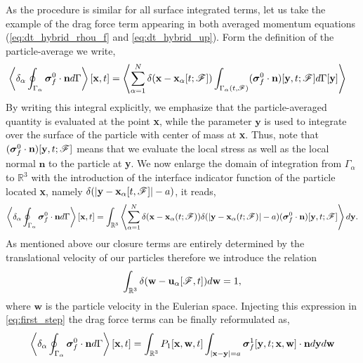 As the procedure is similar for all surface integrated terms, let us take the example of the drag force term appearing in both averaged momentum equations (\ref{eq:dt_hybrid_rhou_f} and \ref{eq:dt_hybrid_up}). 
Form the definition of the particle-average we write,
\begin{align}
    \left<\delta_\alpha \oint_{\Gamma_{\alpha}} \bm\sigma_f^0\cdot\textbf{n} d\Gamma\right>[\textbf{x},t]
    &= \left< \sum_{\alpha=1}^N \delta(\textbf{x}-\textbf{x}_\alpha[t; \mathscr{F}])
    \int_{\Gamma_\alpha(t,\mathscr{F})}
    (\bm\sigma_f^0\cdot\textbf{n})[\textbf{y},t;\mathscr{F}]
    d\Gamma[\textbf{y}] \right>
\end{align}
By writing this integral explicitly, we emphasize that the particle-averaged quantity is evaluated at the point \textbf{x}, while the parameter $\textbf{y}$ is used to integrate over the surface of the particle with center of mass at \textbf{x}. 
Thus, note that $(\bm\sigma_f^0\cdot\textbf{n})[\textbf{y},t;\mathscr{F}]$ means that we evaluate the local stress as well as the local normal $\textbf{n}$ to the particle at \textbf{y}. 
We now enlarge the domain of integration from $\Gamma_\alpha$ to $\mathbb{R}^3$ with the introduction of the interface indicator function of the particle located \textbf{x}, namely $\delta(|\textbf{y} - \textbf{x}_\alpha[t,\mathscr{F}]| - a)$, 
it reads,
\begin{equation}
    \left<\delta_\alpha \oint_{\Gamma_{\alpha}} \bm\sigma_f^0\cdot\textbf{n} d\Gamma\right>[\textbf{x},t]
    = 
    \int_{\mathbb{R}^3}
    \left<
     \sum_{\alpha=1}^N 
     \delta(\textbf{x}-\textbf{x}_\alpha(t; \mathscr{F}))
    \delta(|\textbf{y} - \textbf{x}_{\alpha}(t;\mathscr{F})|-a)
    (\bm\sigma_f^0\cdot\textbf{n})[\textbf{y},t;\mathscr{F}]
    \right>
    d\textbf{y}. 
\end{equation} 
As mentioned above our closure terms are entirely determined by the translational velocity of our particles therefore we introduce the relation 
\begin{equation*}
    \int_{\mathbb{R}^3} \delta(\textbf{w} - \textbf{u}_\alpha[\mathscr{F},t]) d\textbf{w} = 1,
\end{equation*}
where $\textbf{w}$ is the particle velocity in the Eulerian space. 
Injecting this expression in \ref{eq:first_step} the drag force terms can be finally reformulated as, 
\begin{equation}
    \left<\delta_\alpha \oint_{\Gamma_{\alpha}} \bm\sigma_f^0\cdot\textbf{n} d\Gamma\right>[\textbf{x},t]
    =
    \int_{\mathbb{R}^3}
    P_1[\textbf{x},\textbf{w},t]
    \int_{|\textbf{x}-\textbf{y}|=a}
    \bm\sigma_f^1[\textbf{y},t;\textbf{x},\textbf{w}] \cdot \textbf{n}
    d\textbf{y}
    d\textbf{w}
    \label{eq:conditionally_averaged}
\end{equation}
